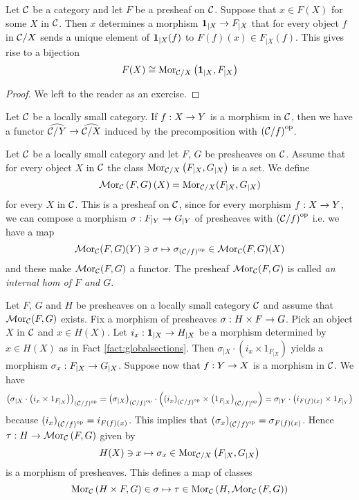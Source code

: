 \begin{fact}\label{fact:globalsections}
Let ${\mathcal C}$ be a category and let $F$ be a presheaf on ${\mathcal C}$. Suppose that $x\in F(X)$ for some $X$ in ${\mathcal C}$. Then $x$ determines a morphism $\mathbf{1}_{\mid X}\rightarrow F_{\mid X}$ that for every object $f$ in ${\mathcal C}/X$ sends a unique element of $\mathbf{1}_{\mid X}(f)$ to $F(f)(x)\in F_{\mid X}(f)$. This gives rise to a bijection
$$F(X)\cong \mathrm{Mor}_{{\mathcal C}/X}\left(\mathbf{1}_{\mid X},F_{\mid X}\right)$$
\end{fact}
\begin{proof}
We left to the reader as an exercise.
\end{proof}
\noindent
Let ${\mathcal C}$ be a locally small category. If $f:X\rightarrow Y$ is a morphism in ${\mathcal C}$, then we have a functor $\widehat{{\mathcal C}/Y}\rightarrow \widehat{{\mathcal C}/X}$ induced by the precomposition with $\left({\mathcal C}/f\right)^{\mathrm{op}}$.

\begin{definition}
Let ${\mathcal C}$ be a locally small category and let $F$, $G$ be presheaves on ${\mathcal C}$. Assume that for every object $X$ in ${\mathcal C}$ the class $\mathrm{Mor}_{{\mathcal C}/X}\left(F_{\mid X},G_{\mid X}\right)$ is a set. We define
$$\mathcal{M}\mathrm{or}_{{\mathcal C}}\left(F,G\right)(X) = \mathrm{Mor}_{{\mathcal C}/X}(F_{\mid X},G_{\mid X})$$
for every $X$ in ${\mathcal C}$. This is a presheaf on ${\mathcal C}$, since for every morphism $f:X\rightarrow Y$, we can compose a morphism $\sigma:F_{\mid Y}\rightarrow G_{\mid Y}$ of presheaves with $\left({\mathcal C}/f\right)^{\mathrm{op}}$ i.e. we have a map 
$$\mathcal{M}\mathrm{or}_{{\mathcal C}}(F,G)(Y)\ni \sigma \mapsto \sigma_{\left({\mathcal C}/f\right)^{\mathrm{op}}}\in \mathcal{M}\mathrm{or}_{{\mathcal C}}(F,G)(X)$$
and these make $\mathcal{M}\mathrm{or}_{{\mathcal C}}(F,G)$ a functor. The presheaf $\mathcal{M}\mathrm{or}_{{\mathcal C}}(F,G)$ is called \textit{an internal hom of $F$ and $G$}.
\end{definition}
\noindent
Let $F$, $G$ and $H$ be presheaves on a locally small category ${\mathcal C}$ and assume that $\mathcal{M}\mathrm{or}_{{\mathcal C}}(F,G)$ exists. Fix a morphism of presheaves $\sigma:H\times F\rightarrow G$. Pick an object $X$ in ${\mathcal C}$ and $x\in H(X)$. Let $i_x:\mathbf{1}_{\mid X}\rightarrow H_{\mid X}$ be a morphism determined by $x\in H(X)$ as in Fact \ref{fact:globalsections}. Then $\sigma_{\mid X}\cdot \left(i_x\times 1_{F_{\mid X}}\right)$ yields a morphism $\sigma_x:F_{\mid X}\rightarrow G_{\mid X}$. Suppose now that $f:Y\rightarrow X$ is a morphism in ${\mathcal C}$. We have 
$$\left(\sigma_{\mid X}\cdot \left(i_{x}\times 1_{F_{\mid X}}\right)\right)_{\left({\mathcal C}/f\right)^{\mathrm{op}}} = \left(\sigma_{\mid X}\right)_{\left({\mathcal C}/f\right)^{\mathrm{op}}}\cdot \left(\left(i_x\right)_{\left({\mathcal C}/f\right)^{\mathrm{op}}}\times \left(1_{F_{\mid X}}\right)_{\left({\mathcal C}/f\right)^{\mathrm{op}}}\right) = \sigma_{\mid Y}\cdot \left(i_{F(f)(x)}\times 1_{F_{\mid Y}}\right)$$
because $\left(i_x\right)_{\left({\mathcal C}/f\right)^{\mathrm{op}}} = i_{F(f)(x)}$. This implies that $\left(\sigma_x\right)_{\left({\mathcal C}/f\right)^{\mathrm{op}}} = \sigma_{F(f)(x)}$. Hence $\tau:H\rightarrow \mathcal{M}\mathrm{or}_{{\mathcal C}}\left(F,G\right)$ given by 
$$H(X)\ni x\mapsto \sigma_x\in \mathrm{Mor}_{{\mathcal C}/X}\left(F_{\mid X},G_{\mid X}\right)$$
is a morphism of presheaves. This defines a map of classes
$$\mathrm{Mor}_{{\mathcal C}}\left(H\times F, G\right)\in \sigma \mapsto \tau \in \mathrm{Mor}_{{\mathcal C}}\left(H,\mathcal{M}\mathrm{or}_{{\mathcal C}}\left(F,G\right)\right)$$

